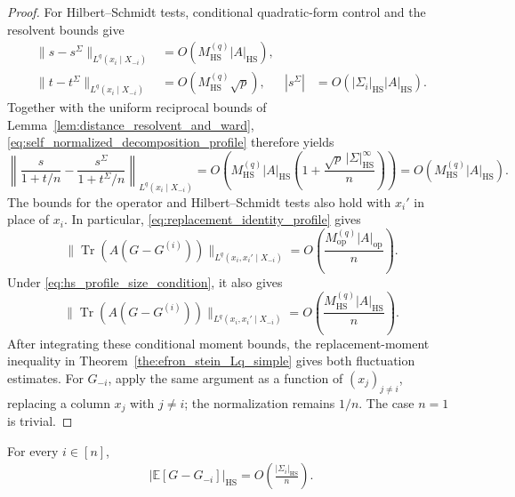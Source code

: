 \documentclass[EJP, preprint, NODS, nobera, nofontexpansion]{ejpecp}
\DeclareMathOperator{\op}{op}
\DeclareMathOperator{\tr}{Tr}
\DeclareMathOperator{\hs}{HS}
\begin{document}
\begin{proof}
For Hilbert--Schmidt tests, conditional quadratic-form control and the
resolvent bounds give
\begin{align*}
    \|s-s^\Sigma\|_{L^q(x_i\mid X_{-i})}
    &=O\left(M_{\hs}^{(q)}|A|_{\hs}\right),\\
    \|t-t^\Sigma\|_{L^q(x_i\mid X_{-i})}
    &=O\left(M_{\hs}^{(q)}\sqrt p\right),
    &|s^\Sigma|&=O\left(|\Sigma_i|_{\hs}|A|_{\hs}\right).
\end{align*}
Together with the uniform reciprocal bounds of
Lemma~\ref{lem:distance_resolvent_and_ward},
\eqref{eq:self_normalized_decomposition_profile} therefore yields
\[
    \left\|\frac{s}{1+t/n}
       -\frac{s^\Sigma}{1+t^\Sigma/n}\right\|_{L^q(x_i\mid X_{-i})}
    =O\left(M_{\hs}^{(q)}|A|_{\hs}
       \left(1+\frac{\sqrt p\,|\Sigma|_{\hs}^\infty}n\right)\right)
    =O\left(M_{\hs}^{(q)}|A|_{\hs}\right).
\]
The bounds for the operator and Hilbert--Schmidt tests also hold
with \(x_i'\) in place of \(x_i\).
In particular, \eqref{eq:replacement_identity_profile} gives
\[
 \|\tr(A(G-G^{(i)}))\|_{L^q(x_i,x_i'\mid X_{-i})}
 =O\left(\frac{M_{\op}^{(q)}|A|_{\op}}n\right).
\]
Under \eqref{eq:hs_profile_size_condition}, it also gives
\[
 \|\tr(A(G-G^{(i)}))\|_{L^q(x_i,x_i'\mid X_{-i})}
 =O\left(\frac{M_{\hs}^{(q)}|A|_{\hs}}n\right).
\]
After integrating these conditional moment bounds, the
replacement-moment inequality in
Theorem~\ref{the:efron_stein_Lq_simple}
gives both fluctuation estimates.
For $G_{-i}$, apply the same argument as a function of
$(x_j)_{j\ne i}$, replacing a column $x_j$ with $j\ne i$; the
normalization remains $1/n$. The case $n=1$ is trivial.
\end{proof}

\begin{lemma}
\label{lem:leave_one_out_profile_bounds}
For every $i\in[n]$,
\begin{align}\label{eq:leave_one_out_hs_profile_bound}
    |\mathbb E[G-G_{-i}]|_{\hs}
    = O\left(\frac{|\Sigma_i|_{\hs}}n\right).
\end{align}
\end{lemma}
\end{document}
